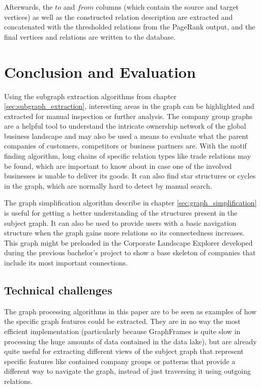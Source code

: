 \documentclass[
  a4paper,     %
  titlepage,   %
  oneside,     %
  parskip      %
]{scrartcl}          %
\begin{document}
  Afterwards, the $to$ and $from$ columns (which contain the source and target vertices)
  as well as the constructed relation description are extracted and concatenated with the thresholded
  relations from the PageRank output, and the final vertices and relations are written
  to the database.

  \section{Conclusion and Evaluation}
  Using the subgraph extraction algorithms from chapter \ref{sec:subgraph_extraction},
  interesting areas in the graph can be highlighted and extracted for manual inspection
  or further analysis. The company group graphs are a helpful tool to understand the intricate
  ownership network of the global business landscape and may also be used a means to evaluate
  what the parent companies of customers, competitors or business partners are.
  With the motif finding algorithm, long chains of specific relation types like
  trade relations may be found, which are important to know about in case one of
  the involved businesses is unable to deliver its goods. It can also find star
  structures or cycles in the graph, which are normally hard to detect by manual
  search.

  The graph simplification algorithm describe in chapter \ref{sec:graph_simplification}
  is useful for getting a better understanding of the structures present in the subject graph.
  It can also be used to provide users with a basic navigation structure when the
  graph gains more relations so its connectedness increases. This graph might
  be preloaded in the Corporate Landscape Explorer developed during the previous
  bachelor's project to show a base skeleton of companies that include its most
  important connections.

  \subsection{Technical challenges}
  The graph processing algorithms in this paper are to be seen as examples of
  how the specific graph features could be extracted. They are in no way the most
  efficient implementation (particularly because GraphFrames is quite slow in
  processing the huge amounts of data contained in the data lake), but are already
  quite useful for extracting different views of the subject graph that represent
  specific features like contained company groups or patterns that provide a different
  way to navigate the graph, instead of just traversing it using outgoing relations.
\end{document}
